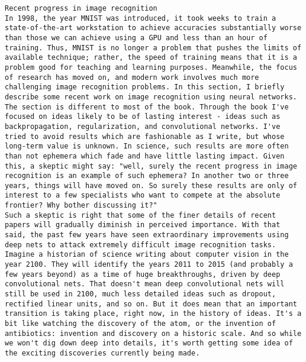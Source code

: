 \begin{lstlisting}
Recent progress in image recognition
In 1998, the year MNIST was introduced, it took weeks to train a state-of-the-art workstation to achieve accuracies substantially worse than those we can achieve using a GPU and less than an hour of training. Thus, MNIST is no longer a problem that pushes the limits of available technique; rather, the speed of training means that it is a problem good for teaching and learning purposes. Meanwhile, the focus of research has moved on, and modern work involves much more challenging image recognition problems. In this section, I briefly describe some recent work on image recognition using neural networks.
The section is different to most of the book. Through the book I've focused on ideas likely to be of lasting interest - ideas such as backpropagation, regularization, and convolutional networks. I've tried to avoid results which are fashionable as I write, but whose long-term value is unknown. In science, such results are more often than not ephemera which fade and have little lasting impact. Given this, a skeptic might say: "well, surely the recent progress in image recognition is an example of such ephemera? In another two or three years, things will have moved on. So surely these results are only of interest to a few specialists who want to compete at the absolute frontier? Why bother discussing it?"
Such a skeptic is right that some of the finer details of recent papers will gradually diminish in perceived importance. With that said, the past few years have seen extraordinary improvements using deep nets to attack extremely difficult image recognition tasks. Imagine a historian of science writing about computer vision in the year 2100. They will identify the years 2011 to 2015 (and probably a few years beyond) as a time of huge breakthroughs, driven by deep convolutional nets. That doesn't mean deep convolutional nets will still be used in 2100, much less detailed ideas such as dropout, rectified linear units, and so on. But it does mean that an important transition is taking place, right now, in the history of ideas. It's a bit like watching the discovery of the atom, or the invention of antibiotics: invention and discovery on a historic scale. And so while we won't dig down deep into details, it's worth getting some idea of the exciting discoveries currently being made.

\end{lstlisting}
